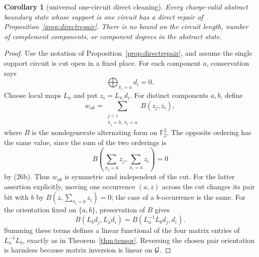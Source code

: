 \documentclass[11pt]{article}
\newtheorem{corollary}[theorem]{Corollary}
\theoremstyle{definition}
\theoremstyle{remark}
\newcommand{\F}{\mathbb F}
\begin{document}
\begin{corollary}[universal one-circuit direct cleaning]
\label{cor:onecircuittensor}
Every charge-valid abstract boundary state whose support is one circuit
has a direct repair of Proposition~\ref{prop:directrepair}.  There is no
bound on the circuit length, number of complement components, or
component degrees in the abstract state.
\end{corollary}

\begin{proof}
Use the notation of Proposition~\ref{prop:directrepair}, and assume the
single support circuit is cut open in a fixed place.  For each component
\(a\), conservation says
\[
                         \bigoplus_{\pi_i=a}d_i=0.        \tag{26b}
\]
Choose local maps \(L_a\) and put \(z_i=L_{\pi_i}d_i\).  For distinct
components \(a,b\), define
\[
 w_{ab}=\sum_{\substack{j<i\\\pi_j=b,\ \pi_i=a}}
                         B(z_j,z_i),                     \tag{26c}
\]
where \(B\) is the nondegenerate alternating form on \(\F_2^2\).
The opposite ordering has the same value, since the sum of the two
orderings is
\[
 B\left(\sum_{\pi_j=b}z_j,\sum_{\pi_i=a}z_i\right)=0
\]
by (26b).  Thus \(w_{ab}\) is symmetric and independent of the cut.
For the latter assertion explicitly, moving one occurrence \((a,z)\)
across the cut changes its pair bit with \(b\) by
\(B(z,\sum_{\pi_i=b}z_i)=0\); the case of a \(b\)-occurrence is the same.
For the orientation fixed on \(\{a,b\}\), preservation of \(B\) gives
\[
 B(L_bd_j,L_ad_i)=B(L_a^{-1}L_bd_j,d_i).
\]
Summing these terms defines a linear functional of the four matrix
entries of \(L_a^{-1}L_b\), exactly as in Theorem~\ref{thm:tensor}.
Reversing the chosen pair orientation is harmless because matrix
inversion is linear on \({\cal G}\).


\end{proof}
\end{document}
